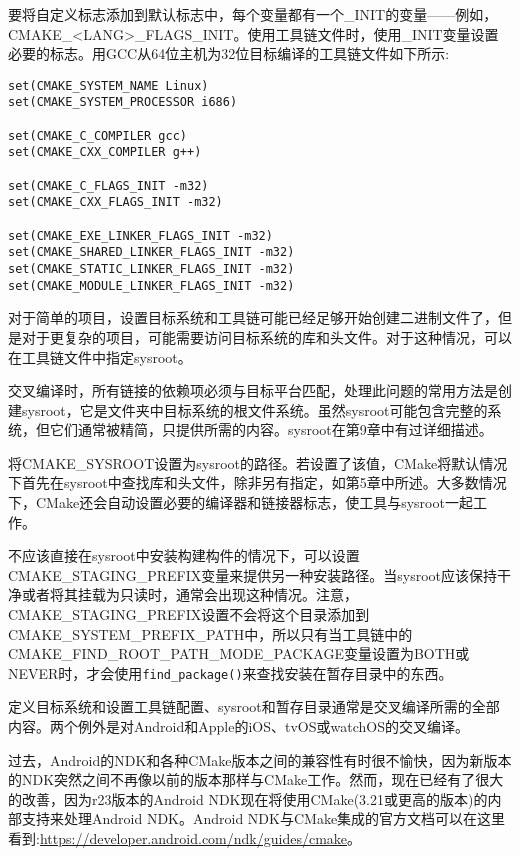 要将自定义标志添加到默认标志中，每个变量都有一个\_INIT的变量——例如，CMAKE\_<LANG>\_FLAGS\_INIT。使用工具链文件时，使用\_INIT变量设置必要的标志。用GCC从64位主机为32位目标编译的工具链文件如下所示:

\begin{lstlisting}[style=styleCMake]
set(CMAKE_SYSTEM_NAME Linux)
set(CMAKE_SYSTEM_PROCESSOR i686)

set(CMAKE_C_COMPILER gcc)
set(CMAKE_CXX_COMPILER g++)

set(CMAKE_C_FLAGS_INIT -m32)
set(CMAKE_CXX_FLAGS_INIT -m32)

set(CMAKE_EXE_LINKER_FLAGS_INIT -m32)
set(CMAKE_SHARED_LINKER_FLAGS_INIT -m32)
set(CMAKE_STATIC_LINKER_FLAGS_INIT -m32)
set(CMAKE_MODULE_LINKER_FLAGS_INIT -m32)
\end{lstlisting}

对于简单的项目，设置目标系统和工具链可能已经足够开始创建二进制文件了，但是对于更复杂的项目，可能需要访问目标系统的库和头文件。对于这种情况，可以在工具链文件中指定sysroot。


交叉编译时，所有链接的依赖项必须与目标平台匹配，处理此问题的常用方法是创建sysroot，它是文件夹中目标系统的根文件系统。虽然sysroot可能包含完整的系统，但它们通常被精简，只提供所需的内容。sysroot在第9章中有过详细描述。

将CMAKE\_SYSROOT设置为sysroot的路径。若设置了该值，CMake将默认情况下首先在sysroot中查找库和头文件，除非另有指定，如第5章中所述。大多数情况下，CMake还会自动设置必要的编译器和链接器标志，使工具与sysroot一起工作。

不应该直接在sysroot中安装构建构件的情况下，可以设置CMAKE\_STAGING\_PREFIX变量来提供另一种安装路径。当sysroot应该保持干净或者将其挂载为只读时，通常会出现这种情况。注意，CMAKE\_STAGING\_PREFIX设置不会将这个目录添加到CMAKE\_SYSTEM\_PREFIX\_PATH中，所以只有当工具链中的CMAKE\_FIND\_ROOT\_PATH\_MODE\_PACKAGE变量设置为BOTH或NEVER时，才会使用\texttt{find\_package()}来查找安装在暂存目录中的东西。

定义目标系统和设置工具链配置、sysroot和暂存目录通常是交叉编译所需的全部内容。两个例外是对Android和Apple的iOS、tvOS或watchOS的交叉编译。


过去，Android的NDK和各种CMake版本之间的兼容性有时很不愉快，因为新版本的NDK突然之间不再像以前的版本那样与CMake工作。然而，现在已经有了很大的改善，因为r23版本的Android NDK现在将使用CMake(3.21或更高的版本)的内部支持来处理Android NDK。Android NDK与CMake集成的官方文档可以在这里看到:\url{https://developer.android.com/ndk/guides/cmake}。

